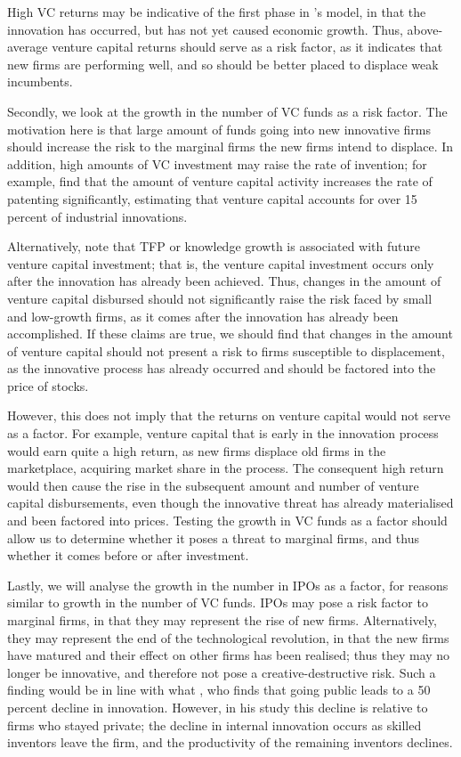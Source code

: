 \documentclass[12pt]{article}
\begin{document}
		High VC returns may be indicative of the first phase in \cite{helpman1994}'s model, in that the innovation has occurred, but has not yet caused economic growth. Thus, above-average venture capital returns should serve as a risk factor, as it indicates that new firms are performing well, and so should be better placed to displace weak incumbents.

		Secondly, we look at the growth in the number of VC funds as a risk factor. The motivation here is that large amount of funds going into new innovative firms should increase the risk to the marginal firms the new firms intend to displace. In addition, high amounts of VC investment may raise the rate of invention; for example, \cite{lerner1998} find that the amount of venture capital activity increases the rate of patenting significantly, estimating that venture capital accounts for over 15 percent of industrial innovations.  

		Alternatively, \cite{ueda2011} note that TFP or knowledge growth is associated with future venture capital investment; that is, the venture capital investment occurs only after the innovation has already been achieved. Thus, changes in the amount of venture capital disbursed should not significantly raise the risk faced by small and low-growth firms, as it comes after the innovation has already been accomplished.  If these claims are true, we should find that changes in the amount of venture capital should not present a risk to firms susceptible to displacement, as the innovative process has already occurred and should be factored into the price of stocks. 

		However, this does not imply that the returns on venture capital would not serve as a factor. For example, venture capital that is early in the innovation process would earn quite a high return, as new firms displace old firms in the marketplace, acquiring market share in the process. The consequent high return would then cause the rise in the subsequent amount and number of venture capital disbursements, even though the innovative threat has already materialised and been factored into prices. Testing the growth in VC funds as a factor should allow us to determine whether it poses a threat to marginal firms, and thus whether it comes before or after investment.

		Lastly, we will analyse the growth in the number in IPOs as a factor, for reasons similar to growth in the number of VC funds. IPOs may pose a risk factor to marginal firms, in that they may represent the rise of new firms. Alternatively, they may represent the end of the technological revolution, in that the new firms have matured and their effect on other firms has been realised; thus they may no longer be innovative, and therefore not pose a creative-destructive risk. Such a finding would be in line with what \cite{bernstein2012}, who finds that going public leads to a 50 percent decline in innovation. However, in his study this decline is relative to firms who stayed private; the decline in internal innovation occurs as skilled inventors leave the firm, and the productivity of the remaining inventors declines. 
\end{document}
